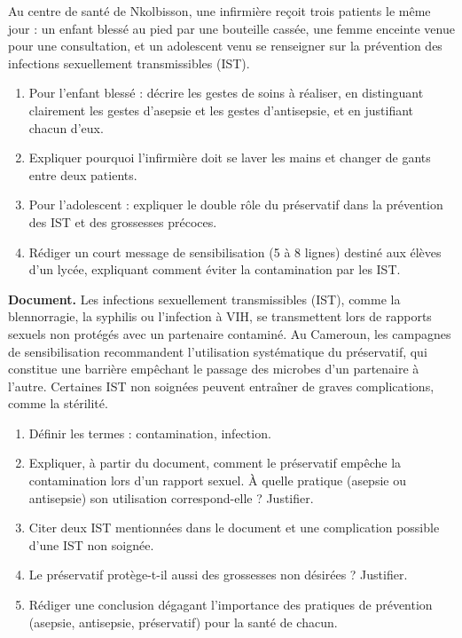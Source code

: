\documentclass[11pt]{article}
\begin{document}
\begin{exercice}
Au centre de santé de Nkolbisson, une infirmière reçoit trois patients le même jour : un enfant blessé au pied par une bouteille cassée, une femme enceinte venue pour une consultation, et un adolescent venu se renseigner sur la prévention des infections sexuellement transmissibles (IST).
\begin{enumerate}
\item Pour l'enfant blessé : décrire les gestes de soins à réaliser, en distinguant clairement les gestes d'asepsie et les gestes d'antisepsie, et en justifiant chacun d'eux.
\item Expliquer pourquoi l'infirmière doit se laver les mains et changer de gants entre deux patients.
\item Pour l'adolescent : expliquer le double rôle du préservatif dans la prévention des IST et des grossesses précoces.
\item Rédiger un court message de sensibilisation (5 à 8 lignes) destiné aux élèves d'un lycée, expliquant comment éviter la contamination par les IST.
\end{enumerate}
\end{exercice}

\begin{exercice}
\textbf{Document.} Les infections sexuellement transmissibles (IST), comme la blennorragie, la syphilis ou l'infection à VIH, se transmettent lors de rapports sexuels non protégés avec un partenaire contaminé. Au Cameroun, les campagnes de sensibilisation recommandent l'utilisation systématique du préservatif, qui constitue une barrière empêchant le passage des microbes d'un partenaire à l'autre. Certaines IST non soignées peuvent entraîner de graves complications, comme la stérilité.
\begin{enumerate}
\item Définir les termes : contamination, infection.
\item Expliquer, à partir du document, comment le préservatif empêche la contamination lors d'un rapport sexuel. À quelle pratique (asepsie ou antisepsie) son utilisation correspond-elle ? Justifier.
\item Citer deux IST mentionnées dans le document et une complication possible d'une IST non soignée.
\item Le préservatif protège-t-il aussi des grossesses non désirées ? Justifier.
\item Rédiger une conclusion dégagant l'importance des pratiques de prévention (asepsie, antisepsie, préservatif) pour la santé de chacun.
\end{enumerate}
\end{exercice}
\end{document}
